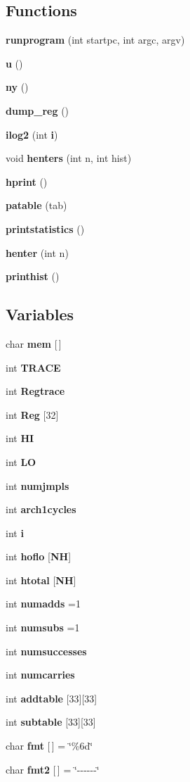 \subsection*{Functions}
\begin{DoxyCompactItemize}
\item 
{\bf runprogram} (int startpc, int argc, argv)
\item 
{\bf u} ()
\item 
{\bf ny} ()
\item 
{\bf dump\+\_\+reg} ()
\item 
{\bf ilog2} (int {\bf i})
\item 
void {\bf henters} (int n, int hist)
\item 
{\bf hprint} ()
\item 
{\bf patable} (tab)
\item 
{\bf printstatistics} ()
\item 
{\bf henter} (int n)
\item 
{\bf printhist} ()
\end{DoxyCompactItemize}
\subsection*{Variables}
\begin{DoxyCompactItemize}
\item 
char {\bf mem} [$\,$]
\item 
int {\bf T\+R\+A\+CE}
\item 
int {\bf Regtrace}
\item 
int {\bf Reg} [32]
\item 
int {\bf HI}
\item 
int {\bf LO}
\item 
int {\bf numjmpls}
\item 
int {\bf arch1cycles}
\item 
int {\bf i}
\item 
int {\bf hoflo} [{\bf NH}]
\item 
int {\bf htotal} [{\bf NH}]
\item 
int {\bf numadds} =1
\item 
int {\bf numsubs} =1
\item 
int {\bf numsuccesses}
\item 
int {\bf numcarries}
\item 
int {\bf addtable} [33][33]
\item 
int {\bf subtable} [33][33]
\item 
char {\bf fmt} [$\,$] = \char`\"{}\%6d\char`\"{}
\item 
char {\bf fmt2} [$\,$] = \char`\"{}-\/-\/-\/-\/-\/-\/\char`\"{}
\end{DoxyCompactItemize}


